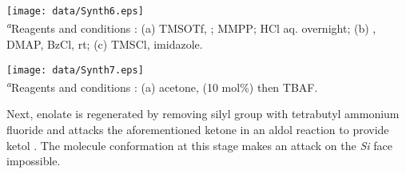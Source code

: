 \vspace{-20pt}
\begin{figure''}
\centering
		\texttt{[image: data/Synth6.eps]}	
    \label{scheme:Synth6}
\\
\justify
\textsf{\scriptsize{\textsuperscript{\textit{a}}Reagents and conditions : (a) TMSOTf, ; MMPP; HCl aq. overnight; (b) , DMAP, BzCl, rt; (c) TMSCl, imidazole.}}
\end{figure''}
\vspace{-20pt}
\begin{figure''}
\centering
		\texttt{[image: data/Synth7.eps]}
    \label{scheme:Synth7}
\\
\justify
\textsf{\scriptsize{\textsuperscript{\textit{a}}Reagents and conditions : (a) acetone,  (10 mol\%) then TBAF.}}
\end{figure''}
Next, enolate is regenerated by removing silyl group with tetrabutyl ammonium fluoride and attacks the aforementioned ketone in an aldol reaction to provide ketol . The molecule conformation at this stage makes an attack on the \textit{Si} face impossible.
